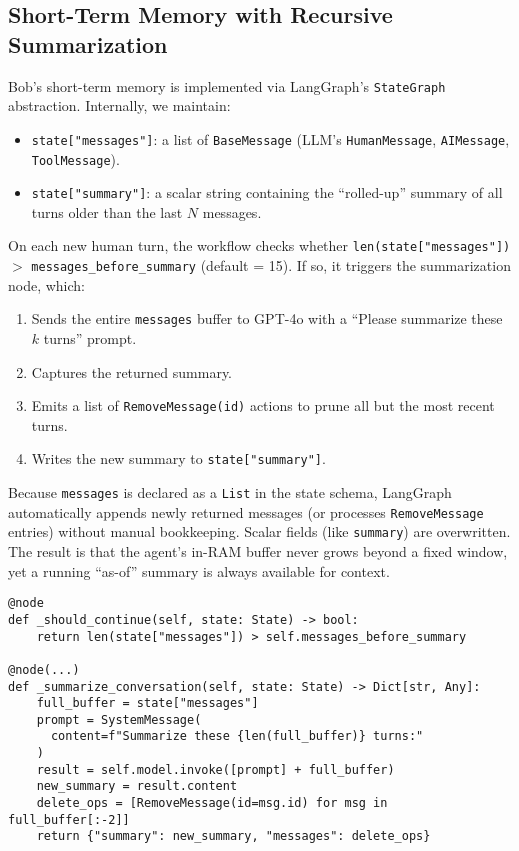 \documentclass[11pt]{article}
\begin{document}
\subsection{Short-Term Memory with Recursive Summarization}
Bob’s short-term memory is implemented via LangGraph’s \texttt{StateGraph} abstraction. Internally, we maintain:
\begin{itemize}[leftmargin=*]
  \item \texttt{state["messages"]}: a list of \texttt{BaseMessage} (LLM’s \texttt{HumanMessage}, \texttt{AIMessage}, \texttt{ToolMessage}).
  \item \texttt{state["summary"]}: a scalar string containing the “rolled-up” summary of all turns older than the last $N$ messages.
\end{itemize}

On each new human turn, the workflow checks whether \texttt{len(state["messages"])} $>$ \texttt{messages\_before\_summary} (default = 15). If so, it triggers the summarization node, which:
\begin{enumerate}[leftmargin=*]
  \item Sends the entire \texttt{messages} buffer to GPT-4o with a “Please summarize these $k$ turns” prompt.
  \item Captures the returned summary.
  \item Emits a list of \texttt{RemoveMessage(id)} actions to prune all but the most recent turns.
  \item Writes the new summary to \texttt{state["summary"]}.
\end{enumerate}

Because \texttt{messages} is declared as a \texttt{List} in the state schema, LangGraph automatically appends newly returned messages (or processes \texttt{RemoveMessage} entries) without manual bookkeeping. Scalar fields (like \texttt{summary}) are overwritten. The result is that the agent’s in-RAM buffer never grows beyond a fixed window, yet a running “as-of” summary is always available for context.

\begin{verbatim}
@node
def _should_continue(self, state: State) -> bool:
    return len(state["messages"]) > self.messages_before_summary

@node(...)
def _summarize_conversation(self, state: State) -> Dict[str, Any]:
    full_buffer = state["messages"]
    prompt = SystemMessage(
      content=f"Summarize these {len(full_buffer)} turns:"
    )
    result = self.model.invoke([prompt] + full_buffer)
    new_summary = result.content
    delete_ops = [RemoveMessage(id=msg.id) for msg in full_buffer[:-2]]
    return {"summary": new_summary, "messages": delete_ops}
\end{verbatim}
\end{document}
